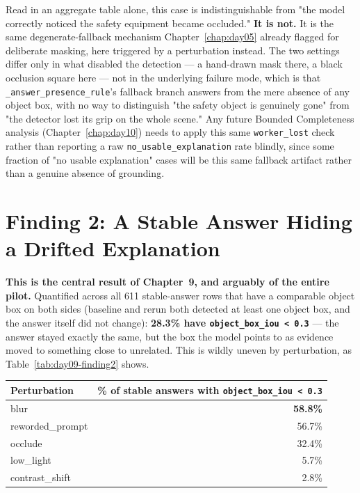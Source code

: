 Read in an aggregate table alone, this case is indistinguishable from "the model correctly noticed
the safety equipment became occluded." \textbf{It is not.} It is the same degenerate-fallback
mechanism Chapter~\ref{chap:day05} already flagged for deliberate masking, here triggered by a
perturbation instead. The two settings differ only in what disabled the detection --- a hand-drawn
mask there, a black occlusion square here --- not in the underlying failure mode, which is that
\texttt{\_answer\_presence\_rule}'s fallback branch answers from the mere absence of any object box,
with no way to distinguish "the safety object is genuinely gone" from "the detector lost its grip on
the whole scene." Any future Bounded Completeness analysis (Chapter~\ref{chap:day10}) needs to apply
this same \texttt{worker\_lost} check rather than reporting a raw \texttt{no\_usable\_explanation}
rate blindly, since some fraction of "no usable explanation" cases will be this same fallback
artifact rather than a genuine absence of grounding.

\section{Finding 2: A Stable Answer Hiding a Drifted Explanation}
\label{sec:day09-finding2}

\textbf{This is the central result of Chapter~9, and arguably of the entire pilot.} Quantified
across all 611 stable-answer rows that have a comparable object box on both sides (baseline and
rerun both detected at least one object box, and the answer itself did not change):
\textbf{28.3\% have \texttt{object\_box\_iou < 0.3}} --- the answer stayed exactly the same, but the
box the model points to as evidence moved to something close to unrelated. This is wildly uneven by
perturbation, as Table~\ref{tab:day09-finding2} shows.

\begin{center}
\begin{tabular}{lr}
\toprule
\textbf{Perturbation} & \textbf{\% of stable answers with \texttt{object\_box\_iou < 0.3}} \\
\midrule
blur & \textbf{58.8\%} \\
reworded\_prompt & 56.7\% \\
occlude & 32.4\% \\
low\_light & 5.7\% \\
contrast\_shift & 2.8\% \\
\bottomrule
\end{tabular}
\label{tab:day09-finding2}
\end{center}


